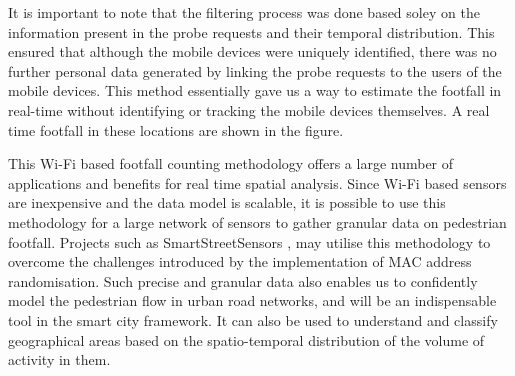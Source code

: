 It is important to note that the filtering process was done based soley on the information present in the probe requests and their temporal distribution.
This ensured that although the mobile devices were uniquely identified, there was no further personal data generated by linking the probe requests to the users of the mobile devices.
This method essentially gave us a way to estimate the footfall in real-time without identifying or tracking the mobile devices themselves. A real time footfall in these locations are shown in the figure.

This Wi-Fi based footfall counting methodology offers a large number of applications and benefits for real time spatial analysis.
Since Wi-Fi based sensors are inexpensive and the data model is scalable, it is possible to use this methodology for a large network of sensors to gather granular data on pedestrian footfall.
Projects such as SmartStreetSensors \citep{sss2016}, may utilise this methodology to overcome the challenges introduced by the implementation of MAC address randomisation.
Such precise and granular data also enables us to confidently model the pedestrian flow in urban road networks, and will be an indispensable tool in the smart city framework.
It can also be used to understand and classify geographical areas based on the spatio-temporal distribution of the volume of activity in them.
